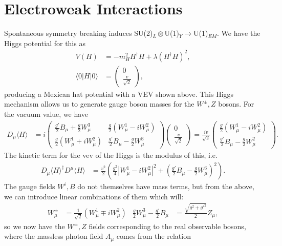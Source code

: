 \documentclass[relqm.tex]{subfiles}
\begin{document}
\chapter{Electroweak Interactions}
Spontaneous symmetry breaking induces SU(2)$_L\otimes$U(1)$_Y\to$U(1)$_{EM}$.
We have the Higgs potential for this as
\begin{align}
    V(H) &= -m_H^2H^\dagger H + \lambda(H^\dagger H)^2, \\
    \langle0|H|0\rangle &= \begin{pmatrix} 0 \\ \frac{v}{\sqrt{2}}\end{pmatrix},
\end{align}
producing a Mexican hat potential with a VEV shown above. 
This Higgs mechanism allows us to generate gauge boson masses for the $W^\pm,Z$ bosons. 
For the vacuum value, we have
\begin{align}
    D_\mu\langle H\rangle &= i\begin{pmatrix} \frac{g'}{2}B_\mu + \frac{g}{2}W_\mu^3 & \frac{g}{2}\left(W^1_\mu - iW_\mu^2\right) \\ \frac{g}{2}\left(W_\mu^1+iW_\mu^2\right) & \frac{g'}{2}B_\mu - \frac{g}{2}W_\mu^3\end{pmatrix} \begin{pmatrix} 0 \\ \frac{v}{\sqrt{2}} \end{pmatrix} = \frac{iv}{\sqrt{2}}\begin{pmatrix} \frac{g}{2}(W_\mu^1-iW_\mu^2) \\ \frac{g'}{2}B_\mu - \frac{g}{2}W_\mu^2\end{pmatrix}.
\end{align}
The kinetic term for the vev of the Higgs is the modulus of this, i.e.
\begin{align}
    D_\mu\langle H\rangle^\dagger D^\mu\langle H\rangle &= \frac{v^2}{2}\left(\frac{g^2}{4}|W_\mu^1-iW_\mu^2|^2 + \left(\frac{g'}{2}B_\mu - \frac{g}{2}W_\mu^3\right)^2\right).
\end{align}
The gauge fields $W^i,B$ do not themselves have mass terms, but from the above, we can introduce linear combinations of them which will:
\begin{align}
    W_\mu^\pm &= \frac{1}{\sqrt{2}}\left(W_\mu^1\mp iW_\mu^2\right) & \frac{g}{2}W_\mu^3 - \frac{g'}{2}B_\mu &= \frac{\sqrt{g^2+g'^2}}{2}Z_\mu,
\end{align}
so we now have the $W^\pm,Z$ fields corresponding to the real observable bosons, where the massless photon field $A_\mu$ comes from the relation
\end{document}
